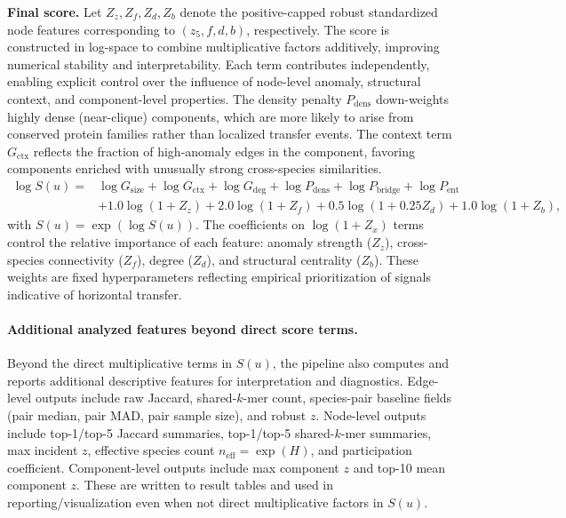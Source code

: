 \documentclass[11pt]{article}
\begin{document}
\vspace{0.5em}
\textbf{Final score.} Let $Z_z,Z_f,Z_d,Z_b$ denote the positive-capped robust standardized node features corresponding to $(z_5,f,d,b)$, respectively. The score is constructed in log-space to combine multiplicative factors additively, improving numerical stability and interpretability. Each term contributes independently, enabling explicit control over the influence of node-level anomaly, structural context, and component-level properties.
The density penalty $P_{\mathrm{dens}}$ down-weights highly dense (near-clique) components, which are more likely to arise from conserved protein families rather than localized transfer events.
The context term $G_{\mathrm{ctx}}$ reflects the fraction of high-anomaly edges in the component, favoring components enriched with unusually strong cross-species similarities.
\begin{equation}
\begin{aligned}
\log S(u)={}&\log G_{\mathrm{size}}+\log G_{\mathrm{ctx}}+\log G_{\mathrm{deg}}
+\log P_{\mathrm{dens}}+\log P_{\mathrm{bridge}}+\log P_{\mathrm{ent}}\\
&+1.0\log(1+Z_z)+2.0\log(1+Z_f)+0.5\log(1+0.25Z_d)+1.0\log(1+Z_b),
\end{aligned}
\end{equation}
with $S(u)=\exp(\log S(u))$. The coefficients on $\log(1+Z_x)$ terms control the relative importance of each feature: anomaly strength ($Z_z$), cross-species connectivity ($Z_f$), degree ($Z_d$), and structural centrality ($Z_b$). 
These weights are fixed hyperparameters reflecting empirical prioritization of signals indicative of horizontal transfer.
\vspace{0.5em}

\paragraph{Additional analyzed features beyond direct score terms.}
Beyond the direct multiplicative terms in $S(u)$, the pipeline also computes and reports additional descriptive features for interpretation and diagnostics. Edge-level outputs include raw Jaccard, shared-$k$-mer count, species-pair baseline fields (pair median, pair MAD, pair sample size), and robust $z$. Node-level outputs include top-1/top-5 Jaccard summaries, top-1/top-5 shared-$k$-mer summaries, max incident $z$, effective species count $n_{\mathrm{eff}}=\exp(H)$, and participation coefficient. Component-level outputs include max component $z$ and top-10 mean component $z$. These are written to result tables and used in reporting/visualization even when not direct multiplicative factors in $S(u)$.
\end{document}
